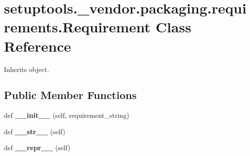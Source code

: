 \hypertarget{classsetuptools_1_1__vendor_1_1packaging_1_1requirements_1_1_requirement}{}\section{setuptools.\+\_\+vendor.\+packaging.\+requirements.\+Requirement Class Reference}
\label{classsetuptools_1_1__vendor_1_1packaging_1_1requirements_1_1_requirement}


Inherits object.

\subsection*{Public Member Functions}
\begin{DoxyCompactItemize}
\item 
\mbox{\label{classsetuptools_1_1__vendor_1_1packaging_1_1requirements_1_1_requirement_a6b223eda020463f3389316de87914bfc}} 
def {\bfseries \+\_\+\+\_\+init\+\_\+\+\_\+} (self, requirement\+\_\+string)
\item 
\mbox{\label{classsetuptools_1_1__vendor_1_1packaging_1_1requirements_1_1_requirement_abb0661b98aa700866ab68a7472a616f7}} 
def {\bfseries \+\_\+\+\_\+str\+\_\+\+\_\+} (self)
\item 
\mbox{\label{classsetuptools_1_1__vendor_1_1packaging_1_1requirements_1_1_requirement_a5481f0c7e97a165e14a3b2b94535d3aa}} 
def {\bfseries \+\_\+\+\_\+repr\+\_\+\+\_\+} (self)
\end{DoxyCompactItemize}
